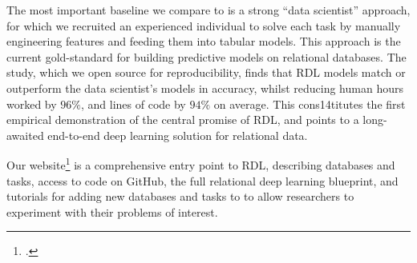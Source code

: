 The most important baseline we compare to is a strong ``data scientist'' approach, for which we recruited an experienced individual to solve each task by manually engineering features and feeding them into tabular models. This approach is the current gold-standard for building predictive models on relational databases. The study, which we open source for reproducibility, finds that RDL models match or outperform the data scientist's models in accuracy, whilst reducing human hours worked by $96\%$, and lines of code by $94\%$ on average. This cons14titutes the first empirical demonstration of the central promise of RDL, and points to 
a long-awaited end-to-end deep learning solution for relational data.

Our website\footnote{\website.} is a comprehensive entry point to RDL, describing \relbench databases and tasks, access to code on GitHub, the full relational deep learning blueprint, and tutorials for adding new databases and tasks to \relbench to allow researchers to experiment with their problems of interest.

